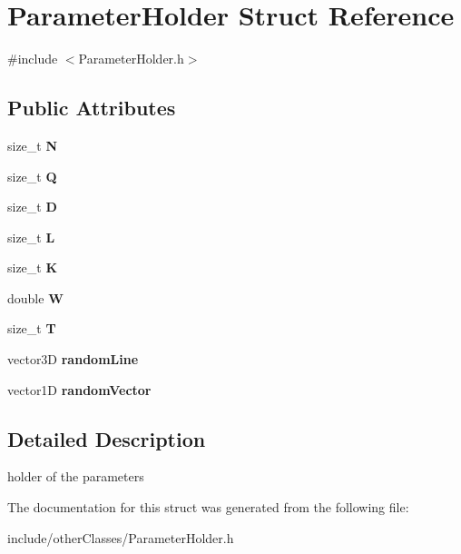 \hypertarget{structParameterHolder}{}\section{Parameter\+Holder Struct Reference}
\label{structParameterHolder}


{\ttfamily \#include $<$Parameter\+Holder.\+h$>$}

\subsection*{Public Attributes}
\begin{DoxyCompactItemize}
\item 
size\+\_\+t {\bfseries N}\hypertarget{structParameterHolder_abf04bdc8f4954f2dc730e4ec1f6cb589}{}\label{structParameterHolder_abf04bdc8f4954f2dc730e4ec1f6cb589}

\item 
size\+\_\+t {\bfseries Q}\hypertarget{structParameterHolder_a49292b559dccdad4ecf5317cf088e525}{}\label{structParameterHolder_a49292b559dccdad4ecf5317cf088e525}

\item 
size\+\_\+t {\bfseries D}\hypertarget{structParameterHolder_aa10de008bcb3a3c0370181b1b30440ff}{}\label{structParameterHolder_aa10de008bcb3a3c0370181b1b30440ff}

\item 
size\+\_\+t {\bfseries L}\hypertarget{structParameterHolder_a49f465155663a7eff67cb0ebed8f28cc}{}\label{structParameterHolder_a49f465155663a7eff67cb0ebed8f28cc}

\item 
size\+\_\+t {\bfseries K}\hypertarget{structParameterHolder_a2dc68102c436923c93bd873e196ca3d3}{}\label{structParameterHolder_a2dc68102c436923c93bd873e196ca3d3}

\item 
double {\bfseries W}\hypertarget{structParameterHolder_a9567671e9b5848da029294125b56a09c}{}\label{structParameterHolder_a9567671e9b5848da029294125b56a09c}

\item 
size\+\_\+t {\bfseries T}\hypertarget{structParameterHolder_a1c271eb7d9fcc2e1e01da6d2f59f1b9c}{}\label{structParameterHolder_a1c271eb7d9fcc2e1e01da6d2f59f1b9c}

\item 
vector3D {\bfseries random\+Line}\hypertarget{structParameterHolder_a77d98aeb2e8e734329d77aa3e647be01}{}\label{structParameterHolder_a77d98aeb2e8e734329d77aa3e647be01}

\item 
vector1D {\bfseries random\+Vector}\hypertarget{structParameterHolder_ac655864a799e02ff8df847c89f2f96ad}{}\label{structParameterHolder_ac655864a799e02ff8df847c89f2f96ad}

\end{DoxyCompactItemize}


\subsection{Detailed Description}
holder of the parameters 

The documentation for this struct was generated from the following file\+:\begin{DoxyCompactItemize}
\item 
include/other\+Classes/Parameter\+Holder.\+h\end{DoxyCompactItemize}
